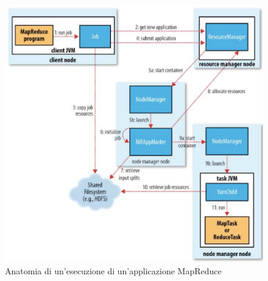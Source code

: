 \documentclass{article}
\begin{document}
\begin{appendices}
\begin{figure}[H]
    \centering
    \includegraphics[scale=0.2]{img/YARNMapreduce.png}
    \caption{Anatomia di un'esecuzione di un'applicazione MapReduce}
\end{figure}\noindent


\end{appendices}
\end{document}
